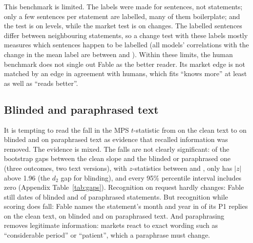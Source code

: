 This benchmark is limited. The labels were made for sentences, not statements; only a few sentences per
statement are labelled, many of them boilerplate; and the test is on levels, while the market test is on
changes. The labelled sentences differ between neighbouring statements, so a change test with these labels
mostly measures which sentences happen to be labelled (all models' correlations with the change in the mean
label are between  and ). Within these limits, the human benchmark does
not single out Fable as the better reader. Its market edge is not matched by an edge in agreement with
humans, which fits ``knows more'' at least as well as ``reads better''.

\subsection{Blinded and paraphrased text}\label{sec:versions-validity}

It is tempting to read the fall in the MPS $t$-statistic from  on the clean text to
 on blinded and  on paraphrased text as evidence that recalled
information was removed. The evidence is mixed. The falls are not clearly significant: of the
 bootstrap gaps between the clean slope and the blinded or paraphrased one (three outcomes, two
text versions), with $z$-statistics between  and , only  has $|z|$
above 1.96 (the $d_2$ gap for blinding), and every 95\% percentile interval includes zero
(Appendix Table~\ref{tab:gaps}). Recognition on request hardly changes: Fable still dates
 of blinded and  of paraphrased statements. But
recognition while scoring does fall: Fable names the statement's month and year in
 of its P1 replies on the clean text,  on blinded
and  on paraphrased text. And paraphrasing removes legitimate information:
markets react to exact wording such as ``considerable period'' or ``patient'', which a paraphrase must
change.

